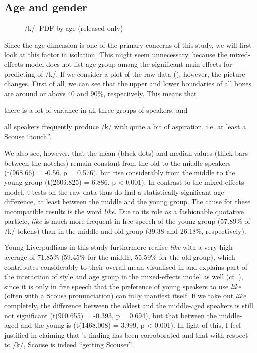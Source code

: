 \subsection{Age and gender}
\label{sec.prod.res.con.k.agegender}

\begin{figure}[h]
	\centering
		\resizebox{0.5\linewidth}{!}{} 
	\caption{/k/: PDF by age (released only)}
	\label{fig.box.k.tot}
\end{figure}

Since the age dimension is one of the primary concerns of this study, we will first look at this factor in isolation.
This might seem unnecessary, because the mixed-effects model does not list age group among the significant main effects for predicting  of /k/.
If we consider a plot of the raw data (), however, the picture changes.
First of all, we can see that the upper and lower boundaries of all boxes are around or above 40 and 90\%, respectively.
This means that
\begin{inparaenum}[(a)]
	\item there is a lot of variance in all three groups of speakers, and
	\item all speakers frequently produce /k/ with quite a bit of aspiration, i.e. at least a Scouse ``touch''.
\end{inparaenum}
We also see, however, that the mean (black dots) and median values (thick bars between the notches) remain constant from the old to the middle speakers (t(968.66) = -0.56, p = 0.576), but rise considerably from the middle to the young group (t(2606.825) = 6.886, p < 0.001).
In contrast to the mixed-effects model, t-tests on the raw data thus do find a statistically significant age difference, at least between the middle and the young group.
The cause for these incompatible results is the word \emph{like}.
Due to its role as a fashionable quotative particle, \emph{like} is much more frequent in free speech of the young group (57.89\% of /k/ tokens) than in the middle and old group (39.38 and 26.18\%, respectively).

Young Liverpudlians in this study furthermore realise \emph{like} with a very high average  of 71.85\% (59.45\% for the middle, 55.59\% for the old group), which contributes considerably to their overall mean visualised in  and explains part of the interaction of style and age group in the mixed-effects model as well (cf. ), since it is only in free speech that the preference of young speakers to use \emph{like} (often with a Scouse pronunciation) can fully manifest itself.
If we take out \emph{like} completely, the difference between the oldest and the middle-aged speakers is still not significant (t(900.655) = -0.393, p = 0.694), but that between the middle-aged and the young is (t(1468.008) = 3.999, p < 0.001).
In light of this, I feel justified in claiming that \citeauthor{watson2007a}'s \citeyearpar{watson2007a} finding has been corroborated and that with respect to /k/, Scouse is indeed ``getting Scouser''.

